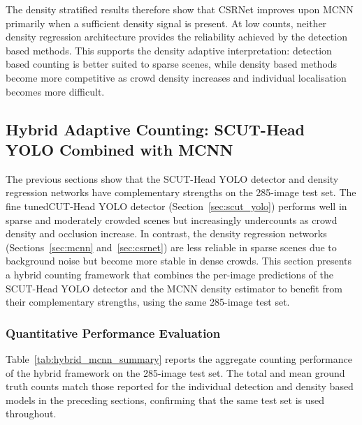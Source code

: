 The density stratified results therefore show that CSRNet improves upon MCNN primarily when a sufficient density signal is present. At low counts, neither density regression architecture provides the reliability achieved by the detection based methods. This supports the density adaptive interpretation: detection based counting is better suited to sparse scenes, while density based methods become more competitive as crowd density increases and individual localisation becomes more difficult.

\subsection{Hybrid Adaptive Counting: SCUT-Head YOLO Combined with MCNN}
\label{sec:hybrid_mcnn}

The previous sections show that the SCUT-Head YOLO detector and density regression networks have complementary strengths on the 285-image test set. The fine tunedCUT-Head YOLO detector (Section~\ref{sec:scut_yolo}) performs well in sparse and moderately crowded scenes but increasingly undercounts as crowd density and occlusion increase. In contrast, the density regression networks (Sections~\ref{sec:mcnn} and~\ref{sec:csrnet}) are less reliable in sparse scenes due to background noise but become more stable in dense crowds. This section presents a hybrid counting framework that combines the per-image predictions of the SCUT-Head YOLO detector and the MCNN density estimator to benefit from their complementary strengths, using the same 285-image test set.

\subsubsection{Quantitative Performance Evaluation}

Table~\ref{tab:hybrid_mcnn_summary} reports the aggregate counting performance of the hybrid framework on the 285-image test set. The total and mean ground truth counts match those reported for the individual detection and density based models in the preceding sections, confirming that the same test set is used throughout.

